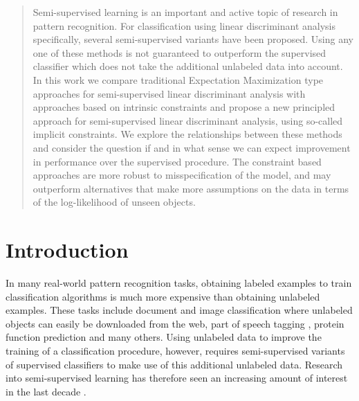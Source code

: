\documentclass[10pt, a4paper, conference]{IEEEtran}
\begin{document}
\begin{abstract}
Semi-supervised learning is an important and active topic of research in pattern recognition. For classification using linear discriminant analysis specifically, several semi-supervised variants have been proposed. Using any one of these methods is not guaranteed to outperform the supervised classifier which does not take the additional unlabeled data into account. In this work we compare traditional Expectation Maximization type approaches for semi-supervised linear discriminant analysis with approaches based on intrinsic constraints and propose a new principled approach for semi-supervised linear discriminant analysis, using so-called implicit constraints. We explore the relationships between these methods and consider the question if and in what sense we can expect improvement in performance over the supervised procedure. The constraint based approaches are more robust to misspecification of the model, and may outperform alternatives that make more assumptions on the data in terms of the log-likelihood of unseen objects.
\end{abstract}





%
\IEEEpeerreviewmaketitle



\section{Introduction}
In many real-world pattern recognition tasks, obtaining labeled examples to train classification algorithms is much more expensive than obtaining unlabeled examples. These tasks include document and image classification \cite{Nigam2000} where unlabeled objects can easily be downloaded from the web, part of speech tagging \cite{Elworthy1994}, protein function prediction \cite{Weston2005} and many others. Using unlabeled data to improve the training of a classification procedure, however, requires semi-supervised variants of supervised classifiers to make use of this additional unlabeled data. Research into semi-supervised learning has therefore seen an increasing amount of interest in the last decade \cite{Chapelle2006}.
\end{document}
